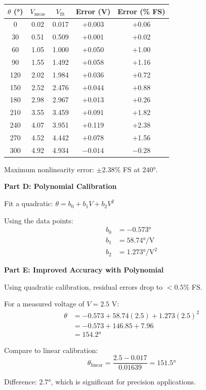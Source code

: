 \begin{example}
\begin{center}
\begin{tabular}{ccccc}
\toprule
$\theta$ (°) & $V_{\text{meas}}$ & $V_{\text{fit}}$ & Error (V) & Error (\% FS) \\
\midrule
0 & 0.02 & 0.017 & +0.003 & +0.06 \\
30 & 0.51 & 0.509 & +0.001 & +0.02 \\
60 & 1.05 & 1.000 & +0.050 & +1.00 \\
90 & 1.55 & 1.492 & +0.058 & +1.16 \\
120 & 2.02 & 1.984 & +0.036 & +0.72 \\
150 & 2.52 & 2.476 & +0.044 & +0.88 \\
180 & 2.98 & 2.967 & +0.013 & +0.26 \\
210 & 3.55 & 3.459 & +0.091 & +1.82 \\
240 & 4.07 & 3.951 & +0.119 & +2.38 \\
270 & 4.52 & 4.442 & +0.078 & +1.56 \\
300 & 4.92 & 4.934 & $-0.014$ & $-0.28$ \\
\bottomrule
\end{tabular}
\end{center}

Maximum nonlinearity error: $\pm 2.38\%$ FS at $240°$.

\textbf{Part D: Polynomial Calibration}

Fit a quadratic: $\theta = b_0 + b_1 V + b_2 V^2$

Using the data points:
\begin{align}
b_0 &= -0.573° \\
b_1 &= 58.74°/\text{V} \\
b_2 &= 1.273°/\text{V}^2
\end{align}

\textbf{Part E: Improved Accuracy with Polynomial}

Using quadratic calibration, residual errors drop to $< 0.5\%$ FS.

For a measured voltage of $V = 2.5\text{ V}$:
\begin{align}
\theta &= -0.573 + 58.74(2.5) + 1.273(2.5)^2 \\
&= -0.573 + 146.85 + 7.96 \\
&= 154.2°
\end{align}

Compare to linear calibration:
\begin{equation}
\theta_{\text{linear}} = \frac{2.5 - 0.017}{0.01639} = 151.5°
\end{equation}

Difference: $2.7°$, which is significant for precision applications.
\end{example}

